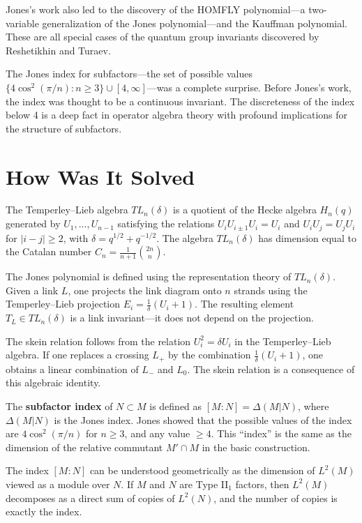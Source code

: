 Jones's work also led to the discovery of the HOMFLY polynomial---a two-variable generalization of the Jones polynomial---and the Kauffman polynomial. These are all special cases of the quantum group invariants discovered by Reshetikhin and Turaev.

The Jones index for subfactors---the set of possible values $\{4\cos^2(\pi/n) : n \geq 3\} \cup [4, \infty]$---was a complete surprise. Before Jones's work, the index was thought to be a continuous invariant. The discreteness of the index below 4 is a deep fact in operator algebra theory with profound implications for the structure of subfactors.

\section{How Was It Solved}

The Temperley--Lieb algebra $TL_n(\delta)$ is a quotient of the Hecke algebra $H_n(q)$ generated by $U_1, \ldots, U_{n-1}$ satisfying the relations $U_i U_{i\pm 1} U_i = U_i$ and $U_i U_j = U_j U_i$ for $|i-j| \geq 2$, with $\delta = q^{1/2} + q^{-1/2}$. The algebra $TL_n(\delta)$ has dimension equal to the Catalan number $C_n = \frac{1}{n+1}\binom{2n}{n}$.

The Jones polynomial is defined using the representation theory of $TL_n(\delta)$. Given a link $L$, one projects the link diagram onto $n$ strands using the Temperley--Lieb projection $E_i = \frac{1}{\delta}(U_i + 1)$. The resulting element $T_L \in TL_n(\delta)$ is a link invariant---it does not depend on the projection.

The skein relation follows from the relation $U_i^2 = \delta U_i$ in the Temperley--Lieb algebra. If one replaces a crossing $L_+$ by the combination $\frac{1}{\delta}(U_i + 1)$, one obtains a linear combination of $L_-$ and $L_0$. The skein relation is a consequence of this algebraic identity.

The \textbf{subfactor index} of $N \subset M$ is defined as $[M:N] = \Delta(M|N)$, where $\Delta(M|N)$ is the Jones index. Jones showed that the possible values of the index are $4\cos^2(\pi/n)$ for $n \geq 3$, and any value $\geq 4$. This ``index'' is the same as the dimension of the relative commutant $M' \cap M$ in the basic construction.

The index $[M:N]$ can be understood geometrically as the dimension of $L^2(M)$ viewed as a module over $N$. If $M$ and $N$ are Type II$_1$ factors, then $L^2(M)$ decomposes as a direct sum of copies of $L^2(N)$, and the number of copies is exactly the index.

